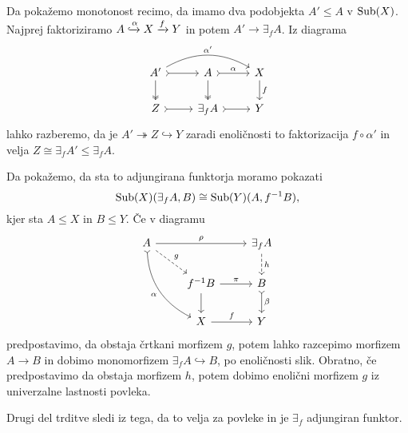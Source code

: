 \documentclass[../kategoricna_logika.tex]{subfiles}
\begin{document}
\begin{dokaz}
  Da pokažemo monotonost recimo, da imamo dva podobjekta $A' \leq A$ v
  $\operatorname{Sub}(X)$.  Najprej faktoriziramo
  $A \xhookrightarrow{\alpha} X \xrightarrow{f} Y$ in potem
  $A' \to \exists_f A$.  Iz diagrama
  \begin{equation*}
    \begin{tikzcd}
      A' \ar[d, two heads] \ar[r, tail] \ar[rr, bend left, "\alpha'"]
      &
      A \ar[d, two heads] \ar[r, tail, "\alpha"] & X \ar[d, "f"] \\
      Z \ar[r, tail] & \exists_f A \ar[r, tail] & Y
    \end{tikzcd}
  \end{equation*}
  lahko razberemo, da je $A' \twoheadrightarrow Z \hookrightarrow Y$
  zaradi enoličnosti to faktorizacija $f \circ \alpha'$ in velja
  $Z \cong \exists_f A' \leq \exists_f A$.

  Da pokažemo, da sta to adjungirana funktorja moramo pokazati
  $$\operatorname{Sub}(X)(\exists_f A, B) \cong \operatorname{Sub}(Y)(A, f^{-1}B),$$
  kjer sta $A \leq X$ in $B \leq Y$. Če v diagramu
  \begin{equation*}
    \begin{tikzcd}
      A \ar[ddr, bend right, tail, "\alpha"'] \ar[dr, dashed, "g"]
      \ar[rr, "\rho"] & &
      \exists_f A \ar[d, dashed, "h"] \\
      & f^{-1}B \ar[d] \ar[r, "\pi"] & B \ar[d, tail, "\beta"] \\
      & X \ar[r, "f"] & Y
    \end{tikzcd}
  \end{equation*}
  predpostavimo, da obstaja črtkani morfizem $g$, potem lahko
  razcepimo morfizem~$A \to B$ in dobimo monomorfizem
  $\exists_f A \hookrightarrow B$, po enoličnosti slik.  Obratno, če
  predpostavimo da obstaja morfizem $h$, potem dobimo enolični
  morfizem $g$ iz univerzalne lastnosti povleka.

  Drugi del trditve sledi iz tega, da to velja za povleke in je
  $\exists_f$ adjungiran funktor.
\end{dokaz}
%
\end{document}
